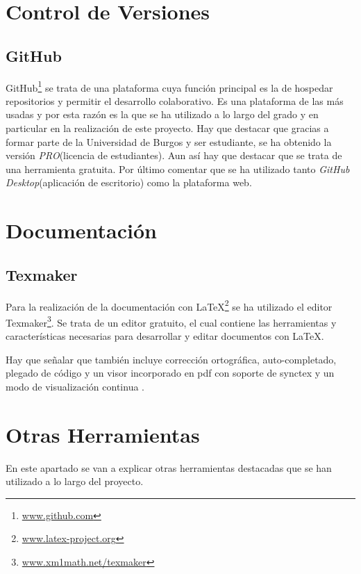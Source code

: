 \section{Control de Versiones}\label{control_de_versiones}
\subsection{GitHub}\label{gitHub}
GitHub\footnote{\href {https://github.com/}{www.github.com}} se trata de una plataforma cuya función principal es la de hospedar repositorios y permitir el desarrollo colaborativo.
Es una plataforma de las más usadas y por esta razón es la que se ha utilizado a lo largo del grado y en particular en la realización de este proyecto. Hay que destacar que gracias a formar parte de la Universidad de Burgos y ser estudiante, se ha obtenido la versión \emph{PRO}(licencia de estudiantes). Aun así hay que destacar que se trata de una herramienta gratuita.
Por último comentar que se ha utilizado tanto \emph{GitHub Desktop}(aplicación de escritorio) como la plataforma web.



\section{Documentación}\label{documentacion}

\subsection{Texmaker}\label{texmaker}
Para la realización de la documentación con \LaTeX\footnote{\href {https://www.latex-project.org/}{www.latex-project.org}} se ha utilizado el editor Texmaker\footnote{\href {https://www.xm1math.net/texmaker/}{www.xm1math.net/texmaker}}. Se trata de un editor gratuito, el cual contiene las herramientas y características necesarias para desarrollar y editar documentos con \LaTeX.

Hay que señalar que también incluye corrección ortográfica, auto-completado, plegado de código y un visor incorporado en pdf con soporte de synctex y un modo de visualización continua \cite{texmaker}. 



\section{Otras Herramientas}\label{otras_herramientas}
En este apartado se van a explicar otras herramientas destacadas que se han utilizado a lo largo del proyecto.

